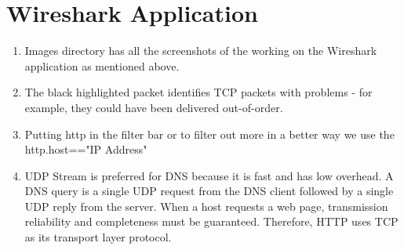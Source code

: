 \documentclass[12pt]{article}
\begin{document}
\section{Wireshark Application}
\begin{enumerate}[label=(\alph*)]
    \item Images directory has all the screenshots of the working on the Wireshark application as mentioned above.
    \item  The black highlighted packet identifies TCP packets with problems - for example, they could have been delivered out-of-order.
    \item Putting http in the filter bar or to filter out more in a better way we use the http.host=="IP Address"
    \item UDP Stream is preferred for DNS because it is fast and has low overhead. A DNS query is a single UDP request from the DNS client followed by a single UDP reply from the server. When a host requests a web page, transmission reliability and completeness must be guaranteed. Therefore, HTTP uses TCP as its transport layer protocol.
    \end{enumerate}
\end{document}
